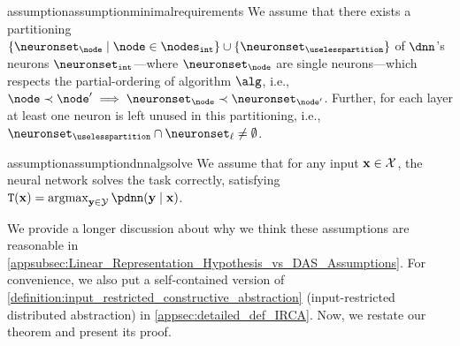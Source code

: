 \begin{restatable}{assumption}{assumptionminimalrequirements}\label{assumption:minimalrequirements}
    We assume that there exists a partitioning $\{\neuronset_{\node} \mid \node \in \nodesint\} \cup \{\neuronset_{\uselesspartition}\}$ of $\dnn$'s neurons
    $\neuronsetint$---where $\neuronset_{\node}$ are single neurons---which respects the partial-ordering of algorithm $\alg$, i.e., $\node \partialsmall \node' \implies \neuronset_{\node} \partialsmall \neuronset_{\node'}$.
    Further, for each layer at least one neuron is left unused in this partitioning, i.e., $\neuronset_{\uselesspartition} \cap \neuronset_{\layer} \neq \emptyset$.
\end{restatable}
\begin{restatable}{assumption}{assumptiondnnalgsolve}\label{assumption:dnnalgsolve}
    We assume that for any input $\mathbf{x} \in \mathcal{X}$, 
    the neural network solves the task correctly, satisfying $\ftask(\bx) = \argmax_{\by \in \calY} \pdnn(\by \mid \bx)$.
\end{restatable}

We provide a longer discussion about why we think these assumptions are reasonable in \cref{appsubsec:Linear_Representation_Hypothesis_vs_DAS_Assumptions}. For convenience, we also put a self-contained version of \cref{definition:input_restricted_constructive_abstraction} (input-restricted distributed abstraction) in \cref{appsec:detailed_def_IRCA}.
Now, we restate our theorem and present its proof.

\existingcausalmapforanyalgorithm*

